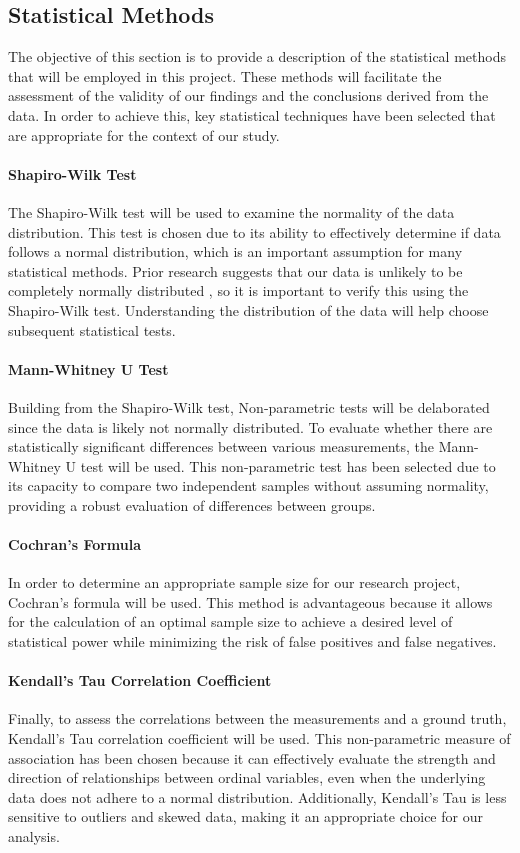 \subsection{Statistical Methods}
The objective of this section is to provide a description of the statistical methods that will be employed in this project. These methods will facilitate the assessment of the validity of our findings and the conclusions derived from the data. In order to achieve this, key statistical techniques have been selected that are appropriate for the context of our study.

\paragraph{Shapiro-Wilk Test}
The Shapiro-Wilk test will be used to examine the normality of the data distribution. This test is chosen due to its ability to effectively determine if data follows a normal distribution, which is an important assumption for many statistical methods. Prior research suggests that our data is unlikely to be completely normally distributed \cite{biksbois}, so it is important to verify this using the Shapiro-Wilk test. Understanding the distribution of the data will help choose subsequent statistical tests.

\paragraph{Mann-Whitney U Test}
Building from the Shapiro-Wilk test, Non-parametric tests will be delaborated since the data is likely not normally distributed. To evaluate whether there are statistically significant differences between various measurements, the Mann-Whitney U test will be used. This non-parametric test has been selected due to its capacity to compare two independent samples without assuming normality, providing a robust evaluation of differences between groups.

\paragraph{Cochran's Formula}
In order to determine an appropriate sample size for our research project, Cochran's formula will be used. This method is advantageous because it allows for the calculation of an optimal sample size to achieve a desired level of statistical power while minimizing the risk of false positives and false negatives.

\paragraph{Kendall's Tau Correlation Coefficient}
Finally, to assess the correlations between the measurements and a ground truth, Kendall's Tau correlation coefficient will be used. This non-parametric measure of association has been chosen because it can effectively evaluate the strength and direction of relationships between ordinal variables, even when the underlying data does not adhere to a normal distribution. Additionally, Kendall's Tau is less sensitive to outliers and skewed data, making it an appropriate choice for our analysis.

